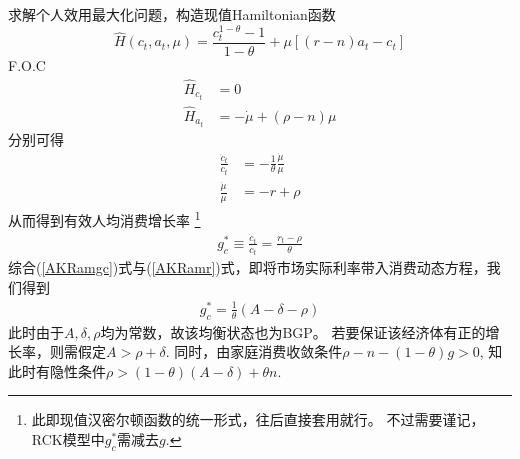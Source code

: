 \documentclass[cn,normal,11pt,black]{elegantnote}
\begin{document}
求解个人效用最大化问题，构造现值Hamiltonian函数
\begin{equation}
    \hat{H}( c_t, a_t, \mu) = \frac{c_t^{1-\theta}-1}{1-\theta} + 
                         \mu\left[(r-n)a_t - c_t \right]
\end{equation}
F.O.C
\begin{align}
    \hat{H}_{c_t} & =0 \\ 
    \hat{H}_{a_t} & = -\dot{\mu} +  (\rho - n) \mu
\end{align}
分别可得
\begin{align}
    \frac{\dot{c}_t}{c_t} & = -\frac{1}{\theta} \frac{\dot{\mu}}{\mu} \\ 
    \frac{\dot{\mu}}{\mu} & = -r + \rho
\end{align}
从而得到有效人均消费增长率
\footnote{此即现值汉密尔顿函数的统一形式，往后直接套用就行。
        不过需要谨记，RCK模型中$g_c^*$需减去$g$.}
\begin{align}\label{AKRamgc}
    g^*_c \equiv \frac{\dot{c}_t}{c_t} = \frac{r_t - \rho}{\theta} 
\end{align}
综合(\ref{AKRamgc})式与(\ref{AKRamr})式，即将市场实际利率带入消费动态方程，我们得到
\begin{align}
    g^*_c =\frac{1}{\theta}(A-\delta-\rho)
\end{align}
此时由于$A,\delta,\rho$均为常数，故该均衡状态也为BGP。
若要保证该经济体有正的增长率，则需假定$A > \rho + \delta$. 
同时，由家庭消费收敛条件$\rho - n - (1-\theta)g >0$, 
知此时有隐性条件$\rho > (1-\theta)(A-\delta) + \theta n$.
\end{document}
